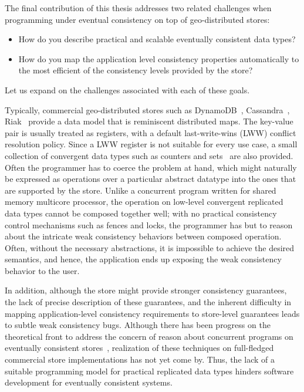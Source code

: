 The final contribution of this thesis addresses two related challenges when
programming under eventual consistency on top of geo-distributed stores:

\begin{itemize}
\item How do you describe practical and scalable eventually consistent data types?
\item How do you map the application level consistency properties automatically
to the most efficient of the consistency levels provided by the store?
\end{itemize}

Let us expand on the challenges associated with each of these goals.

Typically, commercial geo-distributed stores such as DynamoDB~\cite{DynamoDB},
Cassandra~\cite{Lakshman2010}, Riak~\cite{Riak} provide a data model that is
reminiscent distributed maps. The key-value pair is usually treated as
registers, with a default last-write-wins (LWW) conflict resolution policy.
Since a LWW register is not suitable for every use case, a small collection of
convergent data types such as counters and sets~\cite{SSS} are also provided.
Often the programmer has to coerce the problem at hand, which might naturally
be expressed as operations over a particular abstract datatype into the ones
that are supported by the store. Unlike a concurrent program written for shared
memory multicore processor, the operation on low-level convergent replicated
data types cannot be composed together well; with no practical consistency
control mechanisms such as fences and locks, the programmer has but to reason
about the intricate weak consistency behaviors between composed operation.
Often, without the necessary abstractions, it is impossible to achieve the
desired semantics, and hence, the application ends up exposing the weak
consistency behavior to the user.

In addition, although the store might provide stronger consistency guarantees,
the lack of precise description of these guarantees, and the inherent
difficulty in mapping application-level consistency requirements to store-level
guarantees leads to subtle weak consistency bugs. Although there has been
progress on the theoretical front to address the concern of reason about
concurrent programs on eventually consistent stores~\cite{Burckhardt2014},
realization of these techniques on full-fledged commercial store
implementations has not yet come by. Thus, the lack of a suitable programming
model for practical replicated data types hinders software development for
eventually consistent systems.

